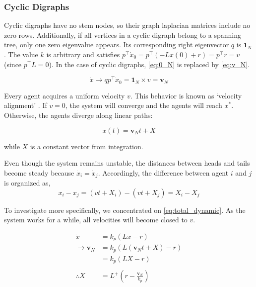 \documentclass[letterpaper, 10 pt, conference]{ieeeconf}  %
\begin{document}
\subsubsection{Cyclic Digraphs}

Cyclic digraphs have no stem nodes, so their graph laplacian matrices include no zero rows. Additionally, if all vertices in a cyclic digraph belong to a spanning tree, only one zero eigenvalue appears. Its corresponding right eigenvector \( q \) is \( \mathbf{1}_N \) \cite{olfati-saber_consensus_2007}. The value \( k \) is arbitrary and satisfies \( p^\top \dot{x}_0 = p^\top (-Lx(0) + r) = p^\top r = v \) (since \( p^\top L = 0 \)). In the case of cyclic digraphs, \eqref{eq:0_N} is replaced by \eqref{eq:v_N}.

\begin{equation}\label{eq:v_N}
    \dot{x} \rightarrow qp^\top \dot{x}_0 = \mathbf{1}_N \times v = \mathbf{v}_N
\end{equation}

\noindent Every agent acquires a uniform velocity \( v \). This behavior is known as `velocity alignment' \cite{dimarogonas_connection_2008}. If \( v = 0 \), the system will converge and the agents will reach \( x^* \). Otherwise, the agents diverge along linear paths:

\[
x(t) = \mathbf{v}_N t + X 
\]

\noindent while \( X \) is a constant vector from integration.


Even though the system remains unstable, the distances between heads and tails become steady because \( \dot{x}_i = \dot{x}_j \). Accordingly, the difference between agent $i$ and $j$ is organized as,
\[
x_i - x_j = (vt + X_i) - (vt +X_j) = X_i-X_j
\]

To investigate more specifically, we concentrated on \eqref{eq:total_dynamic}. As the system works for a while, all velocities will become closed to $v$. 

\begin{equation}\label{eq:findX}
\begin{split}
    \dot{x} &= k_p(Lx - r) \\
   \rightarrow  \mathbf{v}_N &= k_p(L(\mathbf{v}_Nt + X) - r) \\
           &= k_p(LX - r)  \\ \\
 \therefore X &= L^+ (r - \frac{\mathbf{v}_N}{k_p})
\end{split}
\end{equation}
\end{document}
